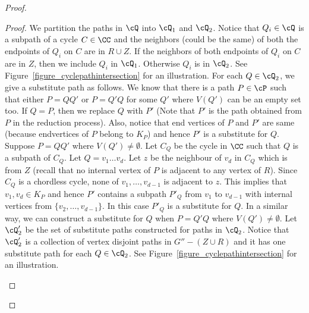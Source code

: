 \begin{proof}
\begin{proof}
We partition the paths in $\cQ$ into $\cQ_1$ and $\cQ_2$. 
Notice that $Q_i\in \cQ$ is a subpath of a cycle $C\in \CC$ and the neighbors (could be the same) 
of  both the endpoints  of $Q_i$ on $C$ are in 
$R\cup Z$. If the neighbors of both endpoints of $Q_i$  on $C$ are in $Z$, then we include $Q_i$ in $\cQ_1$.  Otherwise $Q_i$ is in $\cQ_2$. 
See Figure~\ref{figure_cyclepathintersection} for an illustration. 
For each $Q\in \cQ_2$, we give a substitute path 
as follows. 
We know that there is a path $P\in\cP$ such that  either $P=QQ'$ or $P=Q'Q$ for some $Q'$ where $V(Q')$ can be 
an empty set too.
If $Q=P$, then we replace $Q$ with $P'$ 
(Note that $P'$ is the path obtained from $P$ in the reduction process). Also, notice that end vertices of $P$ and $P'$ are same 
(because endvertices of $P$ belong to $K_P$) 
and hence $P'$ is a substitute for 
$Q$. Suppose $P=QQ'$ where $V(Q')\neq \emptyset$. Let $C_Q$ be the cycle in $\CC$ such that $Q$ is a subpath of $C_Q$. 
Let $Q=v_1\ldots v_{d}$. Let $z$ be the neighbour of $v_d$ in $C_Q$ which is from $Z$ (recall that 
 no internal vertex of $P$ is adjacent to  any vertex of $R$).  
Since 
$C_Q$ is a chordless cycle, none of $v_1,\ldots, v_{d-1}$ is adjacent to $z$. This implies that  $v_1,v_{d}\in K_P$ and hence 
$P'$ contains a subpath $P'_{Q}$ from $v_1$ to $v_{d-1}$ with internal vertices from $\{v_2,\ldots,v_{d-1}\}$. In this case 
$P'_{Q}$ is a substitute for $Q$. In a similar way, we can construct a substitute for $Q$ when  $P=Q'Q$ where $V(Q')\neq \emptyset$. 
Let $\cQ'_2$ be the set of substitute paths constructed for paths in $\cQ_2$. Notice that $\cQ'_2$ 
is a collection of vertex disjoint paths in $G''-(Z\cup R)$ and it has one substitute path for each $Q\in \cQ_2$. 
See Figure~\ref{figure_cyclepathintersection} for an illustration. 




\begin{figure}

\begin{subfigure}[b]{0.5\textwidth}
        \centering
{}
\end{subfigure}
\end{figure}
\end{proof}
\end{proof}

